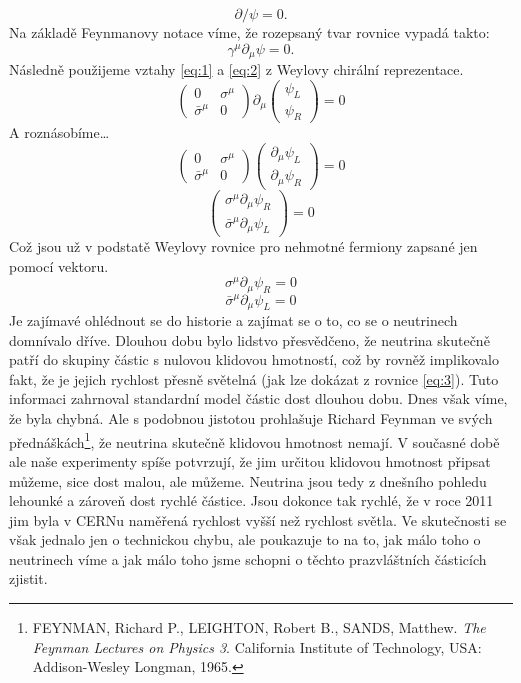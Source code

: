 \documentclass{../../../../style/mkimain}
\begin{document}
\begin{enumerate}
 \begin{equation}\label{eq:3}
 \partial\!\!\!/\psi=0\text{.}    
 \end{equation}
 Na základě Feynmanovy  notace víme, že rozepsaný tvar rovnice vypadá takto:
$$\gamma^\mu\partial_\mu\psi=0\text{.}$$
Následně použijeme vztahy \ref{eq:1} a \ref{eq:2} z Weylovy chirální reprezentace.
$$ \begin{pmatrix}
        0 & \sigma^\mu\\
        \bar{\sigma}^\mu & 0
    \end{pmatrix} \partial_\mu \begin{pmatrix}
        \psi_L\\
        \psi_R
    \end{pmatrix}=0 $$
A roznásobíme\dots
$$ \begin{pmatrix}
        0 & \sigma^\mu\\
        \bar{\sigma}^\mu & 0
    \end{pmatrix} \begin{pmatrix}
        \partial_\mu\psi_L\\
        \partial_\mu\psi_R
    \end{pmatrix}=0 $$
$$ \begin{pmatrix}
        \sigma^\mu \partial_\mu\psi_R\\
        \bar{\sigma}^\mu \partial_\mu\psi_L
    \end{pmatrix}=0 $$
    Což jsou už v podstatě Weylovy rovnice pro nehmotné fermiony zapsané jen pomocí vektoru.
    $$
    \sigma^\mu \partial_\mu \psi_R = 0
    $$
    $$
    \bar{\sigma}^\mu \partial_\mu \psi_L = 0
    $$
    Je zajímavé ohlédnout se do historie a zajímat se o to, co se o neutrinech domnívalo dříve. Dlouhou dobu bylo lidstvo přesvědčeno, že neutrina skutečně patří do skupiny částic s nulovou klidovou hmotností, což by rovněž implikovalo fakt, že je jejich rychlost přesně světelná (jak lze dokázat z rovnice \ref{eq:3}). Tuto informaci zahrnoval standardní model částic dost dlouhou dobu. Dnes však víme, že byla chybná. Ale s podobnou jistotou prohlašuje Richard Feynman ve svých přednáškách\footnote{FEYNMAN, Richard P., LEIGHTON, Robert B., SANDS, Matthew. \textit{The Feynman Lectures on Physics 3}. California Institute of Technology, USA: Addison-Wesley Longman, 1965.}, že neutrina skutečně klidovou hmotnost nemají. V současné době ale naše experimenty spíše potvrzují, že jim určitou klidovou hmotnost připsat můžeme, sice dost malou, ale můžeme. Neutrina jsou tedy z dnešního pohledu lehounké a zároveň dost rychlé částice. Jsou dokonce tak rychlé, že v roce 2011 jim byla v CERNu naměřená rychlost vyšší než rychlost světla. Ve skutečnosti se však jednalo jen o technickou chybu, ale poukazuje to na to, jak málo toho o neutrinech víme a jak málo toho jsme schopni o těchto prazvláštních částicích zjistit.


\end{enumerate}
\end{document}

